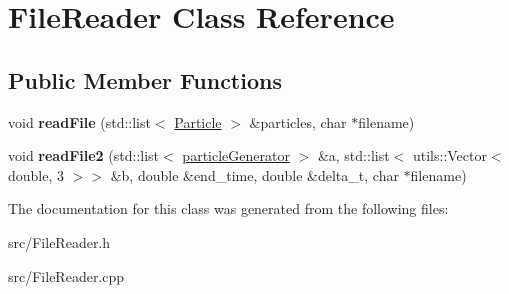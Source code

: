\hypertarget{class_file_reader}{}\section{File\+Reader Class Reference}
\label{class_file_reader}
\subsection*{Public Member Functions}
\begin{DoxyCompactItemize}
\item 
\mbox{\label{class_file_reader_a98e0f676c498629dd005101f399f2a3c}} 
void {\bfseries read\+File} (std\+::list$<$ \mbox{\hyperlink{class_particle}{Particle}} $>$ \&particles, char $\ast$filename)
\item 
\mbox{\label{class_file_reader_a56efd05cfd8e7b6489ac406372b55d67}} 
void {\bfseries read\+File2} (std\+::list$<$ \mbox{\hyperlink{classparticle_generator}{particle\+Generator}} $>$ \&a, std\+::list$<$ utils\+::\+Vector$<$ double, 3 $>$$>$ \&b, double \&end\+\_\+time, double \&delta\+\_\+t, char $\ast$filename)
\end{DoxyCompactItemize}


The documentation for this class was generated from the following files\+:\begin{DoxyCompactItemize}
\item 
src/File\+Reader.\+h\item 
src/File\+Reader.\+cpp\end{DoxyCompactItemize}
